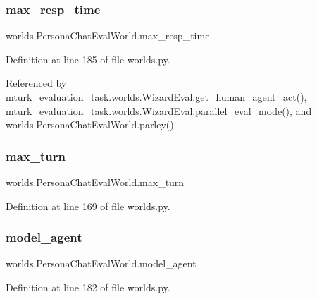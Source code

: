 \subsubsection{\texorpdfstring{max\+\_\+resp\+\_\+time}{max\_resp\_time}}
{\footnotesize\ttfamily worlds.\+Persona\+Chat\+Eval\+World.\+max\+\_\+resp\+\_\+time}



Definition at line 185 of file worlds.\+py.



Referenced by mturk\+\_\+evaluation\+\_\+task.\+worlds.\+Wizard\+Eval.\+get\+\_\+human\+\_\+agent\+\_\+act(), mturk\+\_\+evaluation\+\_\+task.\+worlds.\+Wizard\+Eval.\+parallel\+\_\+eval\+\_\+mode(), and worlds.\+Persona\+Chat\+Eval\+World.\+parley().

\mbox{\label{classworlds_1_1PersonaChatEvalWorld_a2b2a7c4efd28d2fd2efd663bc3fcef1e}} 
\subsubsection{\texorpdfstring{max\+\_\+turn}{max\_turn}}
{\footnotesize\ttfamily worlds.\+Persona\+Chat\+Eval\+World.\+max\+\_\+turn}



Definition at line 169 of file worlds.\+py.

\mbox{\label{classworlds_1_1PersonaChatEvalWorld_af0520dd6c78c88f79fdd70be7bd7778c}} 
\subsubsection{\texorpdfstring{model\+\_\+agent}{model\_agent}}
{\footnotesize\ttfamily worlds.\+Persona\+Chat\+Eval\+World.\+model\+\_\+agent}



Definition at line 182 of file worlds.\+py.



